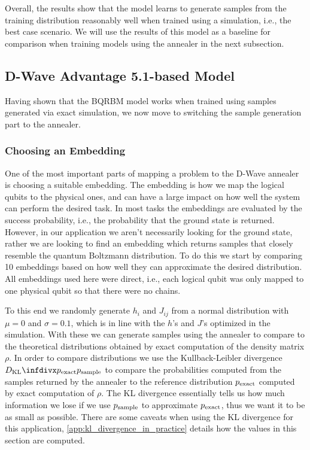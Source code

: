 Overall, the results show that the model learns to generate samples from the training distribution reasonably well when trained using a simulation, i.e., the best case scenario.
We will use the results of this model as a baseline for comparison when training models using the annealer in the next subsection.

\subsection{D-Wave Advantage 5.1-based Model}
Having shown that the BQRBM model works when trained using samples generated via exact simulation, we now move to switching the sample generation part to the annealer.

\subsubsection{Choosing an Embedding}
One of the most important parts of mapping a problem to the D-Wave annealer is choosing a suitable embedding.
The embedding is how we map the logical qubits to the physical ones, and can have a large impact on how well the system can perform the desired task.
In most tasks the embeddings are evaluated by the success probability, i.e., the probability that the ground state is returned.
However, in our application we aren't necessarily looking for the ground state, rather we are looking to find an embedding which returns samples that closely resemble the quantum Boltzmann distribution.
To do this we start by comparing 10 embeddings based on how well they can approximate the desired distribution.
All embeddings used here were direct, i.e., each logical qubit was only mapped to one physical qubit so that there were no chains.

To this end we randomly generate \( h_i \) and \( J_{ij} \) from a normal distribution with \( \mu = 0 \) and \( \sigma = 0.1 \), which is in line with the \( h \)'s and \( J \)'s optimized in the simulation.
With these we can generate samples using the annealer to compare to the theoretical distributions obtained by exact computation of the density matrix \( \rho \).
In order to compare distributions we use the Kullback-Leibler divergence \( \DKL{\pexact}{\psample} \) to compare the probabilities computed from the samples returned by the annealer to the reference distribution \( p_{\text{exact}} \) computed by exact computation of \( \rho \).
The KL divergence essentially tells us how much information we lose if we use \( p_{\text{sample}} \) to approximate \( p_{\text{exact}} \), thus we want it to be as small as possible.
There are some caveats when using the KL divergence for this application, \cref{app:kl_divergence_in_practice} details how the values in this section are computed.

